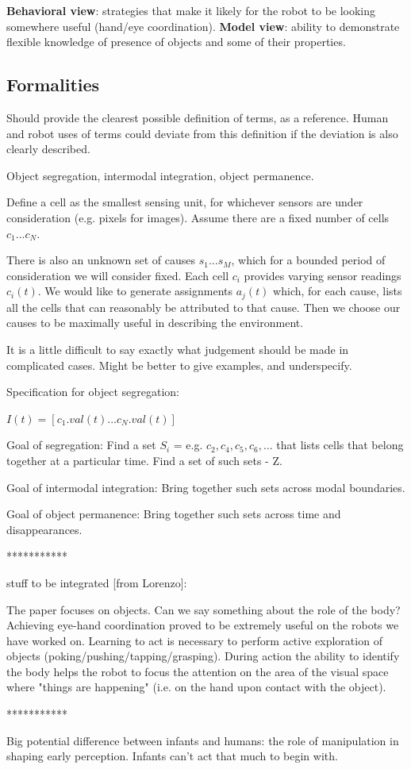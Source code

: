 {\bf Behavioral view}: strategies that make it likely for the robot
to be looking somewhere useful (hand/eye coordination).
{\bf Model view}: ability to demonstrate flexible knowledge of presence of 
objects and some of their properties.


\subsection{Formalities}

Should provide the clearest possible definition of terms,
as a reference.  Human and robot uses of terms could deviate
from this definition if the deviation is also clearly described.

Object segregation, intermodal integration, object permanence.

Define a cell as the smallest sensing unit, for whichever sensors are
under consideration (e.g. pixels for images).  Assume there are a
fixed number of cells $c_1...c_{N}$.

There is also an unknown set of causes $s_1...s_{M}$, which for a
bounded period of consideration we will consider fixed.  Each cell
$c_i$ provides varying sensor readings $c_i(t)$.  We would like to
generate assignments $a_j(t)$ which, for each cause, lists all the
cells that can reasonably be attributed to that cause.  Then we choose
our causes to be maximally useful in describing the environment.

It is a little difficult to say exactly what judgement should be
made in complicated cases.  Might be better to give examples,
and underspecify.

Specification for object segregation:

$I(t) = [c_1.val(t) ... c_N.val(t)]$

Goal of segregation:
  Find a set $S_i$ = e.g. ${ c_2,c_4,c_5,c_6,... }$ that lists cells that
  belong together at a particular time.
  Find a set of such sets - Z.

Goal of intermodal integration:
  Bring together such sets across modal boundaries.

Goal of object permanence:
  Bring together such sets across time and disappearances.


***********

stuff to be integrated [from Lorenzo]:


The paper focuses on objects. Can we say something about the role of the
body? Achieving eye-hand coordination proved to be extremely useful on the
robots we have worked on. Learning to act is necessary to perform active
exploration of objects (poking/pushing/tapping/grasping). During action the
ability to identify the body helps the robot to focus the attention on the
area of the visual space where "things are happening" (i.e. on the hand upon
contact with the object).


***********

Big potential difference between infants and humans: the role
of manipulation in shaping early perception.  Infants can't
act that much to begin with.



